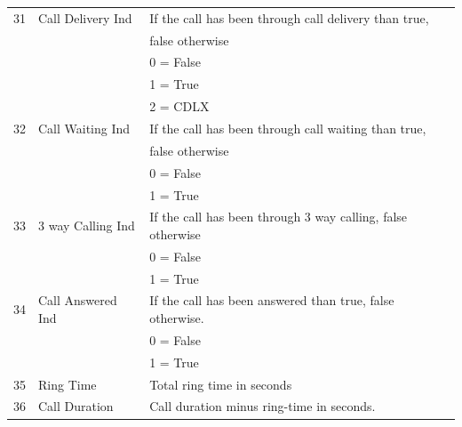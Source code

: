 \documentclass[12pt,twoside]{article}
\begin{document}
\begin{longtable}{cll}
             31  &  Call Delivery Ind        &  If the call has been through call delivery than true,                  \\
                 &                           &  false otherwise                                                        \\
                 &                           &  0 = False                                                              \\
                 &                           &  1 = True                                                               \\
                 &                           &  2 = CDLX                                                               \\
             32  &  Call Waiting Ind         &  If the call has been through call waiting than true,                   \\
                 &                           &  false otherwise                                                        \\
                 &                           &  0 = False                                                              \\
                 &                           &  1 = True                                                               \\
             33  &  3 way Calling Ind        &  If the call has been through 3 way calling, false otherwise            \\
                 &                           &  0 = False                                                              \\
                 &                           &  1 = True                                                               \\
             34  &  Call Answered Ind        &  If the call has been answered than true, false otherwise.              \\
                 &                           &  0 = False                                                              \\
                 &                           &  1 = True                                                               \\
             35  &  Ring Time                &  Total ring time in seconds                                             \\
             36  &  Call Duration            &  Call duration minus ring-time in seconds.                              \\

\end{longtable}
\end{document}
